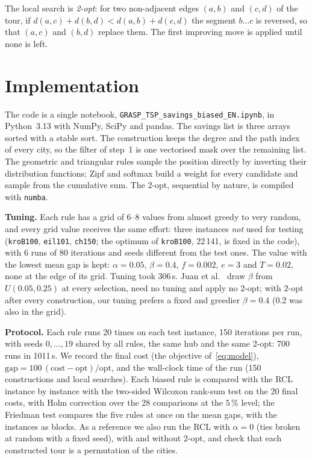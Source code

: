 \documentclass[10pt,a4paper]{article}
\begin{document}
The local search is \emph{2-opt}: for two non-adjacent edges $(a,b)$ and $(c,d)$ of the tour, if
$d(a,c)+d(b,d)<d(a,b)+d(c,d)$ the segment $b\dots c$ is reversed, so that $(a,c)$ and $(b,d)$ replace them. The first improving move is applied until none is left.

\section{Implementation}
\label{sec:impl}

The code is a single notebook, \texttt{GRASP\_TSP\_savings\_biased\_EN.ipynb}, in Python~3.13 with
NumPy, SciPy and pandas. The savings list is three arrays sorted with a stable sort. The construction keeps the degree and the path index of every city, so the filter of step~1 is one vectorised mask over the remaining list. The
geometric and triangular rules sample the position directly by inverting their distribution
functions; Zipf and softmax build a weight for every candidate and sample from the
cumulative sum. The 2-opt, sequential by nature, is compiled with \texttt{numba}.

\textbf{Tuning.} Each rule has a grid of 6--8 values from almost greedy to very
random, and every grid value receives the same effort: three instances \emph{not} used for testing (\texttt{kroB100}, \texttt{eil101},
\texttt{ch150}; the optimum of \texttt{kroB100}, 22\,141, is fixed in the code), with 6 runs of 80 iterations and seeds different from the test ones. The value with the
lowest mean gap is kept: $\alpha=0.05$, $\beta=0.4$, $f=0.002$, $e=3$ and $T=0.02$, none at the edge of
its grid. Tuning took 306\,s. Juan et al.~\cite{juan2011} draw $\beta$ from $U(0.05,0.25)$ at every
selection, need no tuning and apply no 2-opt; with 2-opt after every construction, our tuning
prefers a fixed and greedier $\beta=0.4$ (0.2 was also in the grid).

\textbf{Protocol.} Each rule runs 20 times on each test instance, 150 iterations per run, with seeds
$0,\dots,19$ shared by all rules, the same hub and the same 2-opt: 700 runs in 1011\,s. We record the
final cost (the objective of~\eqref{eq:model}), $\text{gap}=100\,(\text{cost}-\text{opt})/\text{opt}$, and the wall-clock time of the run
(150 constructions and local searches). Each biased rule is compared with the RCL instance by instance
with the two-sided Wilcoxon rank-sum test on the 20 final costs, with Holm correction over the 28
comparisons at the $5\,\%$ level; the Friedman test compares the five rules at once on the mean
gaps, with the instances as blocks. As a reference we also run the RCL with $\alpha=0$ (ties broken at random with a
fixed seed), with and without 2-opt, and check that each constructed tour is a permutation of the
cities.
\end{document}
